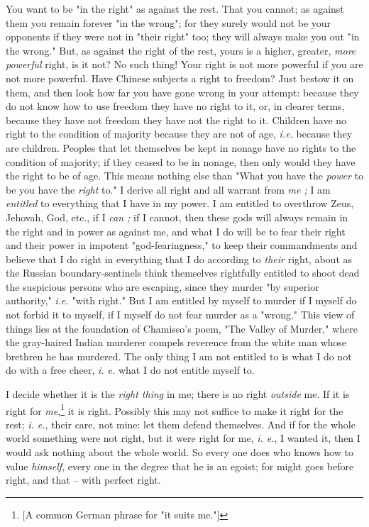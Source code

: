 \documentclass[a4paper]{book}
\begin{document}
You want to be "{}in the right"{} as against the rest. That you cannot; as 
against them you remain forever "{}in the wrong"{}; for they surely would not 
be your opponents if they were not in "{}their right"{} too; they will always 
make you out "{}in the wrong."{} But, as against the right of the rest, yours 
is a higher, greater, \textit{more powerful} right, is it not? No such thing! 
Your right is not more powerful if you are not more powerful. Have Chinese 
subjects a right to freedom? Just bestow it on them, and then look how far you 
have gone wrong in your attempt: because they do not know how to use freedom 
they have no right to it, or, in clearer terms, because they have not freedom 
they have not the right to it. Children have no right to the condition of 
majority because they are not of age, \textit{i.e.} because they are children. 
Peoples that let themselves be kept in nonage have no rights to the condition 
of majority; if they ceased to be in nonage, then only would they have the 
right to be of age. This means nothing else than "{}What you have the 
\textit{power} to be you have the \textit{right} to."{} I derive all right and 
all warrant from \textit{me ;} I am \textit{entitled} to everything that I 
have in my power. I am entitled to overthrow Zeus, Jehovah, God, etc., if I 
\textit{can ;} if I cannot, then these gods will always remain in the right 
and in power as against me, and what I do will be to fear their right and 
their power in impotent "{}god-fearingness,"{} to keep their commandments and 
believe that I do right in everything that I do according to \textit{their} 
right, about as the Russian boundary-sentinels think themselves rightfully 
entitled to shoot dead the suspicious persons who are escaping, since they 
murder "{}by superior authority,"{} \textit{i.e.} "{}with right."{} But I am 
entitled by myself to murder if I myself do not forbid it to myself, if I 
myself do not fear murder as a "{}wrong."{} This view of things lies at the 
foundation of Chamisso's poem, "{}The Valley of Murder,"{} where the 
gray-haired Indian murderer compels reverence from the white man whose 
brethren he has murdered. The only thing I am not entitled to is what I do not 
do with a free cheer, \textit{i. e.} what I do not entitle myself to.

I decide whether it is the \textit{right thing} in me; there is no right 
\textit{outside} me. If it is right for \textit{me},\footnote{[A common German 
phrase for "{}it suits me."{}]} it is right. Possibly this may not suffice to 
make it right for the rest; \textit{i. e.}, their care, not mine: let them 
defend themselves. And if for the whole world something were not right, but it 
were right for me, \textit{i. e.}, I wanted it, then I would ask nothing about 
the whole world. So every one does who knows how to value \textit{himself}, 
every one in the degree that he is an egoist; for might goes before right, and 
that -- with perfect right.
\end{document}
